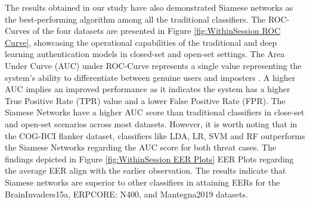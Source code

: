 The results obtained in our study have also demonstrated Siamese networks as the best-performing algorithm among all the traditional classifiers. The ROC-Curves of the four datasets are presented in Figure \ref{fig:WithinSession ROC Curve}, showcasing the operational capabilities of the traditional and deep learning authentication models in closed-set and open-set settings. The Area Under Curve (AUC) under ROC-Curve represents a single value representing the system's ability to differentiate between genuine users and imposters \cite{arias2023performance}. A higher AUC implies an improved performance as it indicates the system has a higher True Positive Rate (TPR) value and a lower False Positive Rate (FPR). The Siamese Networks have a higher AUC score than traditional classifiers in close-set and open-set scenarios across most datasets. However, it is worth noting that in the COG-BCI flanker dataset, classifiers like LDA, LR, SVM and RF outperforms the Siamese Networks regarding the AUC score for both threat cases. The findings depicted in Figure \ref{fig:WithinSession EER Plots} EER Plots regarding the average EER align with the earlier observation. The results indicate that Siamese networks are superior to other classifiers in attaining EERs for the BrainInvaders15a, ERPCORE: N400, and Mantegna2019 datasets. 
\smallskip

